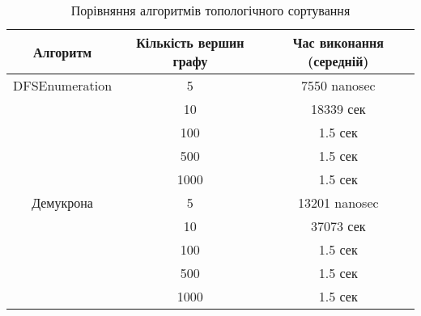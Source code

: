 \documentclass{article}
\begin{document}
\begin{table}
\centering
\begin{tabular}{|c|c|c|}
\hline
Алгоритм & Кількість вершин графу & Час виконання (середній) \\
\hline
DFSEnumeration & 5 & 7550 nanosec \\
& 10 & 18339 сек \\
& 100 & 1.5 сек \\
& 500 & 1.5 сек \\
& 1000 & 1.5 сек \\
\hline
Демукрона & 5 & 13201 nanosec \\
& 10 & 37073 сек \\
& 100 & 1.5 сек \\
& 500 & 1.5 сек \\
& 1000 & 1.5 сек \\
\hline
\end{tabular}
\caption{Порівняння алгоритмів топологічного сортування}
\label{tab:comparison}
\end{table}


\end{document}
